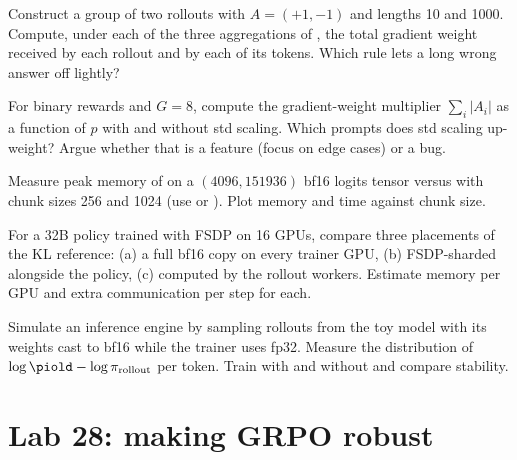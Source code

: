 \begin{exercise}
Construct a group of two rollouts with $A=(+1,-1)$ and lengths 10 and 1000. Compute, under
each of the three aggregations of , the total gradient weight
received by each rollout and by each of its tokens. Which rule lets a long wrong answer off
lightly?
\end{exercise}

\begin{exercise}
For binary rewards and $G=8$, compute the gradient-weight multiplier
$\sum_i|A_i|$ as a function of $p$ with and without std scaling. Which prompts does std
scaling up-weight? Argue whether that is a feature (focus on edge cases) or a bug.
\end{exercise}

\begin{exercise}
Measure peak memory of  on a $(4096, \num{151936})$ bf16 logits tensor
versus  with chunk sizes 256 and 1024 (use
\allowbreak{} or ). Plot memory and time against
chunk size.
\end{exercise}

\begin{exercise}
For a 32B policy trained with FSDP on 16 GPUs, compare three placements of the KL
reference: (a) a full bf16 copy on every trainer GPU, (b) FSDP-sharded alongside the policy,
(c) computed by the rollout workers. Estimate memory per GPU and extra communication per step
for each.
\end{exercise}

\begin{exercise}
Simulate an inference engine by sampling rollouts from the toy model with its weights cast to
bf16 while the trainer uses fp32. Measure the distribution of $\log\piold-\log\pi_{\text{rollout}}$
per token. Train with and without  and compare stability.
\end{exercise}

\section{Lab 28: making GRPO robust}\label{sec:grpo2:lab}

